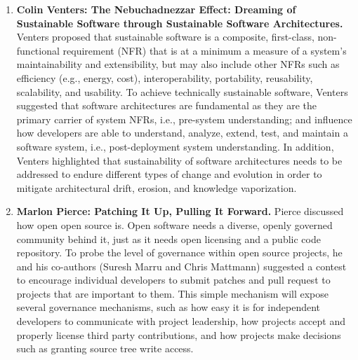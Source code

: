 \documentclass[11pt, oneside]{amsart}
\begin{document}
\begin{enumerate}

\item \textbf{Colin Venters: The Nebuchadnezzar Effect: Dreaming of Sustainable Software
through Sustainable Software Architectures.}
Venters proposed that sustainable software is a composite, first-class,
non-functional requirement (NFR) that is at a minimum a measure of a system's
maintainability and extensibility, but may also include other NFRs such as
efficiency (e.g., energy, cost), interoperability, portability, reusability,
scalability, and usability. To achieve technically sustainable software, Venters
suggested that software architectures are fundamental as they are the primary
carrier of system NFRs, i.e., pre-system understanding; and influence how
developers are able to understand, analyze, extend, test, and maintain a
software system, i.e., post-deployment system understanding. In addition,
Venters highlighted that sustainability of software architectures needs to be
addressed to endure different types of change and evolution in order to mitigate
architectural drift, erosion, and knowledge vaporization.



\item \textbf{Marlon Pierce: Patching It Up, Pulling It Forward.}
Pierce discussed how open open source is. Open software needs a diverse, openly
governed community behind it, just as it needs open licensing and a public code
repository. To probe the level of governance within open source projects, he and
his co-authors (Suresh Marru and Chris Mattmann) suggested a contest to encourage
individual developers to submit patches and pull request to projects that are
important to them. This simple mechanism will expose several governance
mechanisms, such as how easy it is for independent developers to communicate
with project leadership, how projects accept and properly license third party
contributions, and how projects make decisions such as granting source tree
write access.


\end{enumerate}
\end{document}
